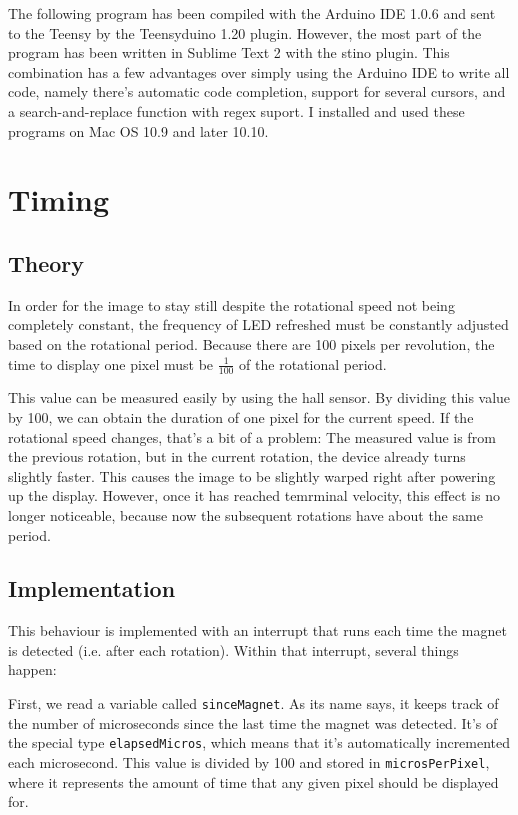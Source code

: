 \documentclass[a4paper, 11pt, titlepage]{report}
\begin{document}
The following program has been compiled with the Arduino IDE 1.0.6 and sent to the Teensy by the
Teensyduino 1.20 plugin. However, the most part of the program has been written in Sublime Text 2
with the stino plugin. This combination has a few advantages over simply using the Arduino IDE to
write all code, namely there's automatic code completion, support for several cursors, and a
search-and-replace function with regex suport. I installed and used these programs on Mac OS 10.9
and later 10.10.

\section{Timing}

\subsection{Theory}

In order for the image to stay still despite the rotational speed not being completely constant,
the frequency of LED refreshed must be constantly adjusted based on the rotational period. Because
there are 100 pixels per revolution, the time to display one pixel must be $\frac{1}{100}$ of the
rotational period.

This value can be measured easily by using the hall sensor. By dividing this value by 100, we can
obtain the duration of one pixel for the current speed. If the rotational speed changes, that's a
bit of a problem: The measured value is from the previous rotation, but in the current rotation,
the device already turns slightly faster. This causes the image to be slightly warped right after
powering up the display. However, once it has reached temrminal velocity, this effect is no longer
noticeable, because now the subsequent rotations have about the same period.

\subsection{Implementation}

This behaviour is implemented with an interrupt that runs each time the magnet is detected (i.e.
after each rotation). Within that interrupt, several things happen:

First, we read a variable called \texttt{sinceMagnet}. As its name says, it keeps track of
the number of microseconds since the last time the magnet was detected. It's of the special type
\texttt{elapsedMicros}, which means that it's automatically incremented each microsecond. This
value is divided by 100 and stored in \texttt{microsPerPixel}, where it represents the amount of
time that any given pixel should be displayed for.
\end{document}
